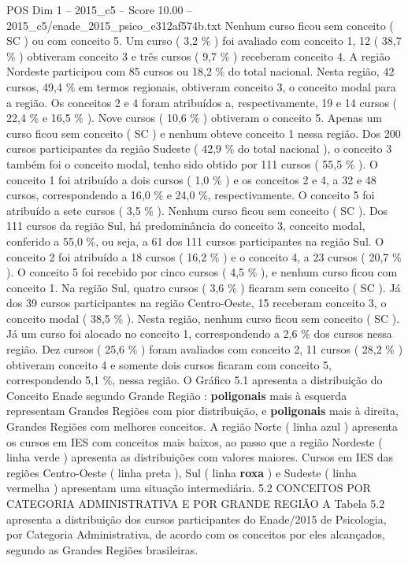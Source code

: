 \begin{textsample}{POS Dim 1 – 2015\_c5 – Score 10.00 – 2015\_c5/enade\_2015\_psico\_e312af574b.txt}
Nenhum curso ficou sem conceito ( SC ) ou com conceito 5.
Um curso ( 3,2 \% ) foi avaliado com conceito 1, 12 ( 38,7 \% ) obtiveram conceito 3 e três cursos ( 9,7 \% ) receberam conceito 4.
A região Nordeste participou com 85 cursos ou 18,2 \% do total nacional.
Nesta região, 42 cursos, 49,4 \% em termos regionais, obtiveram conceito 3, o conceito modal para a região.
Os conceitos 2 e 4 foram atribuídos a, respectivamente, 19 e 14 cursos ( 22,4 \% e 16,5 \% ).
Nove cursos ( 10,6 \% ) obtiveram o conceito 5.
Apenas um curso ficou sem conceito ( SC ) e nenhum obteve conceito 1 nessa região.
Dos 200 cursos participantes da região Sudeste ( 42,9 \% do total nacional ), o conceito 3 também foi o conceito modal, tenho sido obtido por 111 cursos ( 55,5 \% ).
O conceito 1 foi atribuído a dois cursos ( 1,0 \% ) e os conceitos 2 e 4, a 32 e 48 cursos, correspondendo a 16,0 \% e 24,0 \%, respectivamente.
O conceito 5 foi atribuído a sete cursos ( 3,5 \% ).
Nenhum curso ficou sem conceito ( SC ).
Dos 111 cursos da região Sul, há predominância do conceito 3, conceito modal, conferido a 55,0 \%, ou seja, a 61 dos 111 cursos participantes na região Sul.
O conceito 2 foi atribuído a 18 cursos ( 16,2 \% ) e o conceito 4, a 23 cursos ( 20,7 \% ).
O conceito 5 foi recebido por cinco cursos ( 4,5 \% ), e nenhum curso ficou com conceito 1.
Na região Sul, quatro cursos ( 3,6 \% ) ficaram sem conceito ( SC ).
Já dos 39 cursos participantes na região Centro-Oeste, 15 receberam conceito 3, o conceito modal ( 38,5 \% ).
Nesta região, nenhum curso ficou sem conceito ( SC ).
Já um curso foi alocado no conceito 1, correspondendo a 2,6 \% dos cursos nessa região.
Dez cursos ( 25,6 \% ) foram avaliados com conceito 2, 11 cursos ( 28,2 \% ) obtiveram conceito 4 e somente dois cursos ficaram com conceito 5, correspondendo 5,1 \%, nessa região.
O Gráfico 5.1 apresenta a distribuição do Conceito Enade segundo Grande Região : \textbf{poligonais} mais à esquerda representam Grandes Regiões com pior distribuição, e \textbf{poligonais} mais à direita, Grandes Regiões com melhores conceitos.
A região Norte ( linha azul ) apresenta os cursos em IES com conceitos mais baixos, ao passo que a região Nordeste ( linha verde ) apresenta as distribuições com valores maiores.
Cursos em IES das regiões Centro-Oeste ( linha preta ), Sul ( linha \textbf{roxa} ) e Sudeste ( linha vermelha ) apresentam uma situação intermediária. 5.2 CONCEITOS POR CATEGORIA ADMINISTRATIVA E POR GRANDE REGIÃO A Tabela 5.2 apresenta a distribuição dos cursos participantes do Enade/2015 de Psicologia, por Categoria Administrativa, de acordo com os conceitos por eles alcançados, segundo as Grandes Regiões brasileiras.

\end{textsample}
